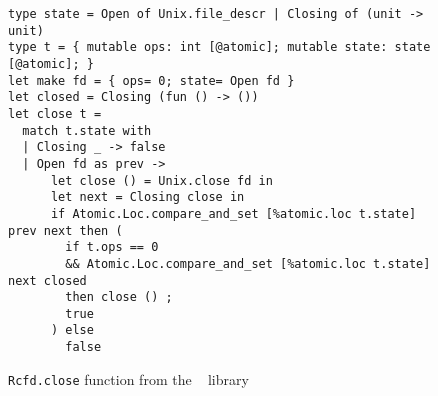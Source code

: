 \begin{figure}[htb]
\begin{verbatim}
type state = Open of Unix.file_descr | Closing of (unit -> unit)
type t = { mutable ops: int [@atomic]; mutable state: state [@atomic]; }
let make fd = { ops= 0; state= Open fd }
let closed = Closing (fun () -> ())
let close t =
  match t.state with
  | Closing _ -> false
  | Open fd as prev ->
      let close () = Unix.close fd in
      let next = Closing close in
      if Atomic.Loc.compare_and_set [%atomic.loc t.state] prev next then (
        if t.ops == 0
        && Atomic.Loc.compare_and_set [%atomic.loc t.state] next closed
        then close () ;
        true
      ) else
        false
\end{verbatim}
\caption{\texttt{Rcfd.close} function from the \Eio~\cite{eio} library}
\label{fig:rcfd}
\end{figure}